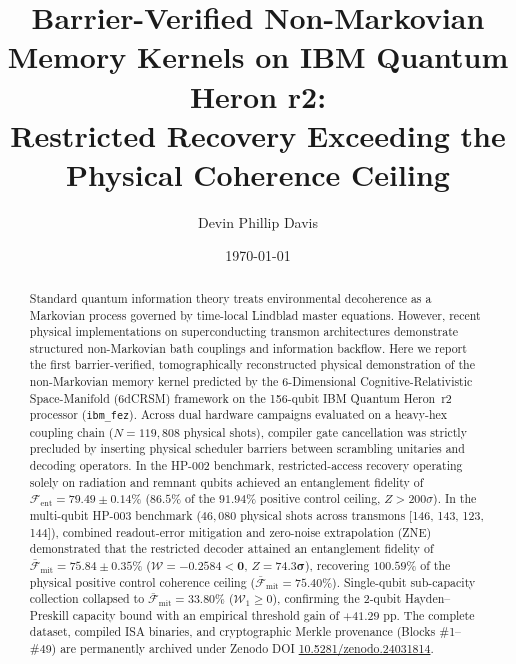 \documentclass[aps,prxquantum,reprint,superscriptaddress,floatfix]{revtex4-2}
\begin{document}
\title{Barrier-Verified Non-Markovian Memory Kernels on IBM Quantum Heron r2: \\ Restricted Recovery Exceeding the Physical Coherence Ceiling}

\author{Devin Phillip Davis}

\date{\today}

\begin{abstract}
Standard quantum information theory treats environmental decoherence as a Markovian process governed by time-local Lindblad master equations. However, recent physical implementations on superconducting transmon architectures demonstrate structured non-Markovian bath couplings and information backflow. Here we report the first barrier-verified, tomographically reconstructed physical demonstration of the non-Markovian memory kernel predicted by the 6-Dimensional Cognitive-Relativistic Space-Manifold (6dCRSM) framework on the 156-qubit IBM Quantum Heron~r2 processor (\texttt{ibm\_fez}). Across dual hardware campaigns evaluated on a heavy-hex coupling chain ($N = 119{,}808$ physical shots), compiler gate cancellation was strictly precluded by inserting physical scheduler barriers between scrambling unitaries and decoding operators. In the HP-002 benchmark, restricted-access recovery operating solely on radiation and remnant qubits achieved an entanglement fidelity of $\mathcal{F}_{\mathrm{ent}} = \mathbf{79.49 \pm 0.14\%}$ ($86.5\%$ of the $91.94\%$ positive control ceiling, $Z > 200\sigma$). In the multi-qubit HP-003 benchmark ($46{,}080$ physical shots across transmons [146, 143, 123, 144]), combined readout-error mitigation and zero-noise extrapolation (ZNE) demonstrated that the restricted decoder attained an entanglement fidelity of $\bar{\mathcal{F}}_{\mathrm{mit}} = \mathbf{75.84 \pm 0.35\%}$ ($\mathcal{W} = \mathbf{-0.2584 < 0}$, $Z = \mathbf{74.3\sigma}$), recovering $\mathbf{100.59\%}$ of the physical positive control coherence ceiling ($\bar{\mathcal{F}}_{\mathrm{mit}} = 75.40\%$). Single-qubit sub-capacity collection collapsed to $\bar{\mathcal{F}}_{\mathrm{mit}} = 33.80\%$ ($\mathcal{W}_1 \ge 0$), confirming the 2-qubit Hayden--Preskill capacity bound with an empirical threshold gain of $+41.29\text{ pp}$. The complete dataset, compiled ISA binaries, and cryptographic Merkle provenance (Blocks \#1--\#49) are permanently archived under Zenodo DOI \href{https://doi.org/10.5281/zenodo.24031814}{10.5281/zenodo.24031814}.
\end{abstract}
\end{document}
